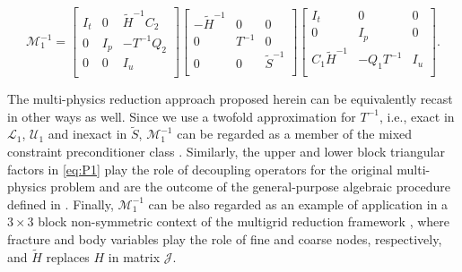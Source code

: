 \documentclass[3p,times]{elsarticle}
\theoremstyle{plain}
\newcommand{\Mat}[1]{#1}
\newcommand{\tS}{\widetilde{S}}
\newcommand{\tH}{\widetilde{H}}
\begin{document}
\begin{equation}
  \mathcal{M}_1^{-1} = \begin{bmatrix}
    \Mat{I}_t & \Mat{0} & \Mat{\tH}^{-1}\Mat{C}_2 \\
    \Mat{0} & \Mat{I}_p & -\Mat{T}^{-1}\Mat{Q}_2 \\
    \Mat{0} & \Mat{0} & \Mat{I}_u \\
  \end{bmatrix} \begin{bmatrix}
    -\Mat{\tH}^{-1} & \Mat{0} & \Mat{0} \\
    \Mat{0} & \Mat{T}^{-1} & \Mat{0} \\
    \Mat{0} & \Mat{0} & \Mat{\tS}^{-1} \\
  \end{bmatrix} \begin{bmatrix}
    \Mat{I}_t & \Mat{0} & \Mat{0} \\
    \Mat{0} & \Mat{I}_p & \Mat{0} \\
    \Mat{C}_1\Mat{\tH}^{-1} & -\Mat{Q}_1\Mat{T}^{-1} & \Mat{I}_u \\
  \end{bmatrix}.
  \label{eq:P1}
\end{equation}

\begin{rem}
The multi-physics reduction approach proposed herein can be equivalently recast in other ways as well. Since we use a twofold approximation for $T^{-1}$, i.e., exact in $\mathcal{L}_1$, $\mathcal{U}_1$ and inexact in $\tS$, $\mathcal{M}_1^{-1}$ can be regarded as a member of the mixed constraint preconditioner class \cite{Bergamaschi2008,ferjangam08,Ferronato2010}. Similarly, the upper and lower block triangular factors in \eqref{eq:P1} play the role of decoupling operators for the original multi-physics problem and are the outcome of the general-purpose algebraic procedure defined in \cite{Ferronato2019}. Finally, $\mathcal{M}_1^{-1}$ can be also regarded as an example of application in a $3\times 3$ block non-symmetric context of the multigrid reduction framework \cite{Bui2018,Bui2020}, where fracture and body variables play the role of fine and coarse nodes, respectively, and $\tH$ replaces $H$ in matrix $\mathcal{J}$.
\end{rem}
\end{document}
